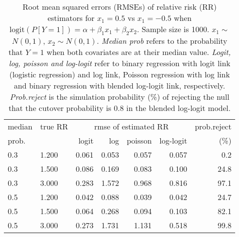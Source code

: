 \documentclass[12pt,a4paper]{article}
\begin{document}
\begin{table}[H] 
\small\sf\centering 
\caption{Root mean squared errors (RMSEs) of relative risk (RR) estimators for $x_1=0.5$ vs $x_1=-0.5$ when $\mbox{logit}(P[Y=1])=\alpha+\beta_1 x_1 + \beta_2 x_2$. Sample size is 1000. $x_1 \sim $$N(0,1)$, $x_2 \sim N(0,1)$. {\it Median prob} refers to the probability that $Y=1$ when both covariates are at their median value. {\it Logit, log, poisson and log-logit} refer to binary regression with logit link (logistic regression) and log link, Poisson regression with log link and binary regression with blended log-logit link, respectively. {\it Prob.reject} is the simulation probability (\%) of rejecting the null that the cutover probability is $0.8$ in the blended log-logit model.} 
\begin{tabular}{llrrrrr} 
\toprule 
median & true RR & \multicolumn{4}{c}{rmse of estimated RR} & prob.reject \\ 
prob. & & logit & log & poisson & log-logit  & (\%) \\ \midrule 
0.3 & 1.200 & 0.061 & 0.053 & 0.057 & 0.057 &  0.2 \\  
0.3 & 1.500 & 0.086 & 0.169 & 0.083 & 0.100 & 24.8 \\  
0.3 & 3.000 & 0.283 & 1.572 & 0.968 & 0.816 & 97.1 \\  
0.5 & 1.200 & 0.042 & 0.088 & 0.039 & 0.042 & 24.7 \\  
0.5 & 1.500 & 0.064 & 0.268 & 0.094 & 0.103 & 82.1 \\  
0.5 & 3.000 & 0.273 & 1.731 & 1.131 & 0.518 & 99.8 \\  
\bottomrule 
\end{tabular} 
\end{table} 
\end{document}
